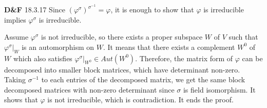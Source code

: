\documentclass[a4paper, 12pt]{article}
\theoremstyle{Mydefinition}
\theoremstyle{Mytheorem}
\begin{document}
\noindent \textbf{D\&F} 18.3.17
Since $(\varphi^\sigma)^{\sigma^{-1}} = \varphi$, it is enough to show that $\varphi$ is irreducible implies $\varphi^\sigma$ is irreducible.

Assume $\varphi^\sigma$ is not irreducible, so there exists a proper subspace $W$ of $V$ such that $\varphi^\sigma|_W$ is an automorphism on $W$. It means that there exists a complement $W^0$ of $W$ which also satisfies $\varphi^\sigma|_{W^0}\in Aut(W^0)$. Therefore, the matrix form of $\varphi$ can be decomposed into smaller block matrices, which have determinant non-zero. Taking $\sigma^{-1}$ to each entries of the decomposed matrix, we get the same block decomposed matrices with non-zero determinant since $\sigma$ is field isomorphism. It shows that $\varphi$ is not irreducible, which is contradiction. It ends the proof.\\
\end{document}
